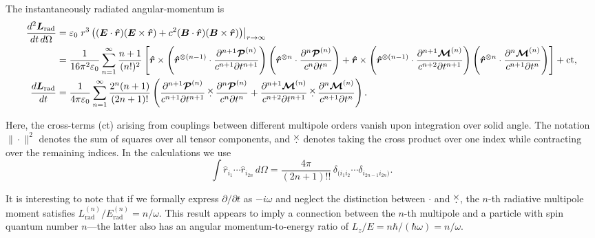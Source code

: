 \documentclass{article}
\newcommand{\crossdot}
{
	\mathbin{\vcenter{\offinterlineskip
			\hbox to 6pt{\hss$\times$\hss}
			\hbox to 6pt{\hss$\cdot$\hss}}}
}
\begin{document}
	The instantaneously radiated angular-momentum is
	\small
\[
\begin{split}
	\frac{d^2 \bm{L}_{\text{rad}}}{dt \, d\Omega}
	&= \varepsilon_0 \left. r^3 \left( (\bm{E} \cdot \bm{\hat{r}})(\bm{E} \times \bm{\hat{r}})
	+ c^2 (\bm{B} \cdot \bm{\hat{r}})(\bm{B} \times \bm{\hat{r}}) \right) \right|_{r \to \infty} \\
	&= \frac{1}{16\pi^2 \varepsilon_0} \sum_{n=1}^{\infty} \frac{n+1}{(n!)^2} \left[
	\bm{\hat{r}} \times \left( \bm{\hat{r}}^{\otimes (n-1)} \cdot \frac{\partial^{n+1} \bm{\mathcal{P}}^{(n)}}{c^{n+1} \partial t^{n+1}} \right)
	\left( \bm{\hat{r}}^{\otimes n} \cdot \frac{\partial^n \bm{\mathcal{P}}^{(n)}}{c^n \partial t^n} \right) + \bm{\hat{r}} \times \left( \bm{\hat{r}}^{\otimes (n-1)} \cdot \frac{\partial^{n+1} \bm{\mathcal{M}}^{(n)}}{c^{n+2} \partial t^{n+1}} \right)
	\left( \bm{\hat{r}}^{\otimes n} \cdot \frac{\partial^n \bm{\mathcal{M}}^{(n)}}{c^{n+1} \partial t^n} \right) \right] + \text{ct}, \\
	\frac{d \bm{L}_{\text{rad}}}{dt}
	&= \frac{1}{4\pi \varepsilon_0} \sum_{n=1}^{\infty} \frac{2^n (n+1)}{(2n+1)!} \left(
	\frac{\partial^{n+1} \bm{\mathcal{P}}^{(n)}}{c^{n+1} \partial t^{n+1}} \crossdot
	\frac{\partial^n \bm{\mathcal{P}}^{(n)}}{c^n \partial t^n}
	+ \frac{\partial^{n+1} \bm{\mathcal{M}}^{(n)}}{c^{n+2} \partial t^{n+1}} \crossdot
	\frac{\partial^n \bm{\mathcal{M}}^{(n)}}{c^{n+1} \partial t^n} \right).
\end{split}
\]
	\normalsize
	
	Here, the cross-terms (ct) arising from couplings between different multipole orders vanish upon integration over solid angle. The notation $\|\cdot\|^2$ denotes the sum of squares over all tensor components, and $\crossdot$ denotes taking the cross product over one index while contracting over the remaining indices. In the calculations we use
	\[
	\int \hat{r}_{i_1} \cdots \hat{r}_{i_{2n}}\, d\Omega
	= \frac{4\pi}{(2n+1)!!}\, \delta_{(i_1 i_2} \cdots \delta_{i_{2n-1} i_{2n})}.
	\]
	
	It is interesting to note that if we formally express $\partial/\partial t$ as $-i\omega$ and neglect the distinction between $\cdot$ and $\crossdot$, the $n$-th radiative multipole moment satisfies $L_{\text{rad}}^{(n)}/E_{\text{rad}}^{(n)} = n/\omega$. This result appears to imply a connection between the $n$-th multipole and a particle with spin quantum number $n$—the latter also has an angular momentum-to-energy ratio of $L_z/E = n\hbar/(\hbar\omega) = n/\omega$.
	
\end{document}
